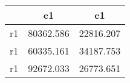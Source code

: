 \begin{table}[htbp]
\begin{tabular}{lcc} \hline \hline
 & c1  & c1  \\  \hline 
r1 & 80362.586 & 22816.207 \\  
r1 & 60335.161 & 34187.753 \\  
r1 & 92672.033 & 26773.651 \\  
\hline \hline \end{tabular}
\end{table}
